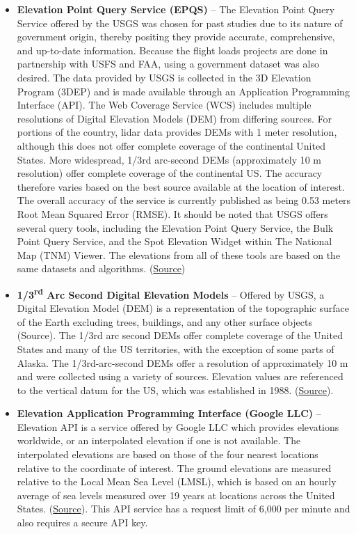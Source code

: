 \documentclass[conf]{new-aiaa}
\begin{document}
\begin{itemize} \item \textbf{Elevation Point Query Service (EPQS)} – The Elevation Point Query Service offered by the USGS was chosen for past studies due to its nature of government origin, thereby positing they provide accurate, comprehensive, and up-to-date information. Because the flight loads projects are done in partnership with USFS and FAA, using a government dataset was also desired. The data provided by USGS is collected in the 3D Elevation Program (3DEP) and is made available through an Application Programming Interface (API). The Web Coverage Service (WCS) includes multiple resolutions of Digital Elevation Models (DEM) from differing sources. For portions of the country, lidar data provides DEMs with 1 meter resolution, although this does not offer complete coverage of the continental United States.  More widespread, 1/3rd arc-second DEMs (approximately 10 m resolution) offer complete coverage of the continental US. The accuracy therefore varies based on the best source available at the location of interest. The overall accuracy of the service is currently published as being 0.53 meters Root Mean Squared Error (RMSE). It should be noted that USGS offers several query tools, including the Elevation Point Query Service, the Bulk Point Query Service, and the Spot Elevation Widget within The National Map (TNM) Viewer.  The elevations from all of these tools are based on the same datasets and algorithms. (\href{https://www.usgs.gov/faqs/how-accurate-are-elevations-generated-elevation-point-query-service-national-map}{Source}) 

\item \textbf{1/3\textsuperscript{rd} Arc Second Digital Elevation Models} – Offered by USGS, a Digital Elevation Model (DEM) is a representation of the topographic surface of the Earth excluding trees, buildings, and any other surface objects (Source). The 1/3rd arc second DEMs offer complete coverage of the United States and many of the US territories, with the exception of some parts of Alaska.  The 1/3rd-arc-second DEMs offer a resolution of approximately 10 m and were collected using a variety of sources. Elevation values are referenced to the vertical datum for the US, which was established in 1988.  (\href{https://data.usgs.gov/datacatalog/data/USGS:3a81321b-c153-416f-98b7-cc8e5f0e17c3}{Source}).

\item \textbf{Elevation Application Programming Interface (Google LLC)} – Elevation API is a service offered by Google LLC which provides elevations worldwide, or an interpolated elevation if one is not available. The interpolated elevations are based on those of the four nearest locations relative to the coordinate of interest. The ground elevations are measured relative to the Local Mean Sea Level (LMSL), which is based on an hourly average of sea levels measured over 19 years at locations across the United States. (\href{https://education.nationalgeographic.org/resource/sea-level/}{Source}). This API service has a request limit of 6,000 per minute and also requires a secure API key.

\end{itemize}
\end{document}
